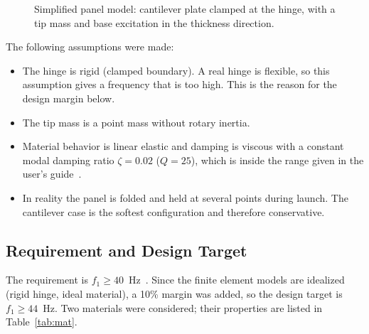 \documentclass[letterpaper,10pt]{article}
\begin{document}
\begin{figure}[htbp]
\centering
{}
\caption{Simplified panel model: cantilever plate clamped at the hinge, with a tip
mass and base excitation in the thickness direction.}
\label{fig:sketch}
\end{figure}

The following assumptions were made:
\begin{itemize}[nosep,leftmargin=2.5em]
  \item The hinge is rigid (clamped boundary). A real hinge is flexible, so this
        assumption gives a frequency that is too high. This is the reason for the
        design margin below.
  \item The tip mass is a point mass without rotary inertia.
  \item Material behavior is linear elastic and damping is viscous with a constant
        modal damping ratio $\zeta = 0.02$ ($Q = 25$), which is inside the range
        given in the user's guide~\cite{rideshare}.
  \item In reality the panel is folded and held at several points during launch. The
        cantilever case is the softest configuration and therefore conservative.
\end{itemize}

\subsection{Requirement and Design Target}

The requirement is $f_1 \geq 40$~Hz~\cite{rideshare}. Since the finite element
models are idealized (rigid hinge, ideal material), a 10\% margin was added, so the
design target is $f_1 \geq 44$~Hz. Two materials were considered; their properties
are listed in Table~\ref{tab:mat}.
\end{document}
